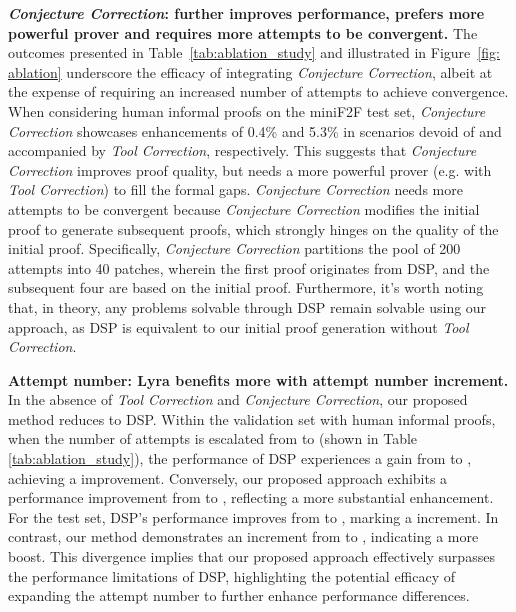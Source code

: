 \documentclass{article} \usepackage{iclr2024_conference,times}
\def\methodOneFull{\textit{Tool Correction}\xspace}
\def\methodTwoFull{\textit{Conjecture Correction}\xspace}
\def\shortname{Lyra\xspace}
\begin{document}
\textbf{\methodTwoFull: further improves performance, prefers more powerful prover and requires more attempts to be convergent.} The outcomes presented in Table~\ref{tab:ablation_study} and illustrated in Figure~\ref{fig: ablation} underscore the efficacy of integrating \methodTwoFull, albeit at the expense of requiring an increased number of attempts to achieve convergence. When considering
human informal proofs on the miniF2F test set, \methodTwoFull showcases enhancements of 0.4\%
and 5.3\% in scenarios devoid of and accompanied by \methodOneFull, respectively. This suggests that \methodTwoFull improves proof quality, but needs a more powerful prover (e.g. with \methodOneFull) to fill the formal gaps. \methodTwoFull needs more attempts to be convergent because \methodTwoFull modifies the initial proof to generate subsequent proofs, which strongly hinges on the quality of the initial proof. Specifically, \methodTwoFull partitions the pool of 200 attempts into 40 patches, wherein the first proof originates from DSP, and the subsequent four are based on the initial proof. Furthermore, it's worth noting that, in theory, any problems solvable through DSP remain solvable using our approach, as DSP is equivalent to our initial proof generation without \methodOneFull.

\textbf{Attempt number: \shortname benefits more with attempt number increment.} In the absence of \methodOneFull and \methodTwoFull, our proposed method reduces to DSP. Within the validation set with human informal proofs, when the number of attempts is escalated from  to  (shown in Table \ref{tab:ablation_study}), the performance of DSP experiences a gain from  to , achieving a  improvement. Conversely, our proposed approach exhibits a performance improvement from  to , reflecting a more substantial  enhancement. For the test set, DSP's performance improves from  to , marking a  increment. In contrast, our method demonstrates an increment from  to , indicating a more  boost. This divergence implies that our proposed approach effectively surpasses the performance limitations of DSP, highlighting the potential efficacy of expanding the attempt number to further enhance performance differences.
\end{document}
